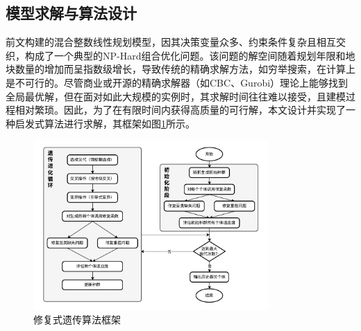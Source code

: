 


\subsection{模型求解与算法设计}

前文构建的混合整数线性规划模型，因其决策变量众多、约束条件复杂且相互交织，构成了一个典型的NP-Hard组合优化问题。该问题的解空间随着规划年限和地块数量的增加而呈指数级增长，导致传统的精确求解方法，如穷举搜索，在计算上是不可行的。尽管商业或开源的精确求解器（如CBC、Gurobi）理论上能够找到全局最优解，但在面对如此大规模的实例时，其求解时间往往难以接受，且建模过程相对繁琐。因此，为了在有限时间内获得高质量的可行解，本文设计并实现了一种启发式算法进行求解，其框架如图\ref{fig:algorithm_framework}所示。

\begin{figure}[htbp]
	\centering
	\includegraphics[width=0.8\textwidth]{figs/3问题一/遗传算法图.pdf}
	\caption{修复式遗传算法框架}
	\label{fig:algorithm_framework}
\end{figure}


